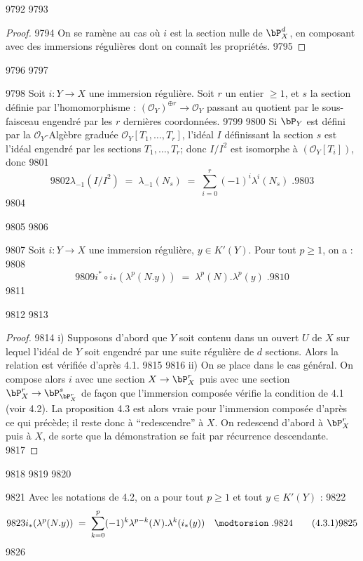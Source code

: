   9792	
  9793	\begin{proof}
  9794	On se ramène au cas où $i$ est la section nulle de $\bP^d_X$, en composant avec des immersions régulières dont on connaît les propriétés.
  9795	\end{proof}
  9796	
  9797	\begin{proposition}[4.2]%
  9798	Soit $i : Y \to X$ une immersion régulière. Soit $r$ un entier $\geq 1$, et $s$ la section définie par l'homomorphisme : $(\mathscr{O}_Y)^{\oplus r} \to \mathscr{O}_Y$ passant au quotient par le sous-faisceau engendré par les $r$ dernières coordonnées.
  9799	
  9800	Si $\bP_Y$ est défini par la $\mathscr{O}_Y$-Algèbre graduée $\mathscr{O}_Y[T_1,\ldots,T_r]$, l'idéal $I$ définissant la section $s$ est l'idéal engendré par les sections $T_1,\ldots,T_r$; donc $I/I^2$ est isomorphe à $(\mathscr{O}_Y[T_i])$, donc
  9801	\[
  9802	\lambda_{-1}(I/I^2) \; = \; \lambda_{-1}(N_s) \; = \; \sum_{i=0}^{r} (-1)^i \lambda^i(N_s)\; .
  9803	\]
  9804	\end{proposition}
  9805	
  9806	\begin{proposition}[4.3]%
  9807	Soit $i : Y \to X$ une immersion régulière, $y \in K'(Y)$. Pour tout $p \geq 1$, on a :
  9808	\[
  9809	i^* \circ i_*(\lambda^p(N.y)) \; = \; \lambda^p(N) . \lambda^p(y)\; .
  9810	\]
  9811	\end{proposition}
  9812	
  9813	\begin{proof}
  9814	i) Supposons d'abord que $Y$ soit contenu dans un ouvert $U$ de $X$ sur lequel l'idéal de $Y$ soit engendré par une suite régulière de $d$ sections. Alors la relation est vérifiée d'après 4.1.
  9815	
  9816	ii) On se place dans le cas général. On compose alors $i$ avec une section $X \to \bP^r_X$ puis avec une section $\bP^r_X \to \bP^s_{\bP^r_X}$ de façon que l'immersion composée vérifie la condition de 4.1 (voir 4.2). La proposition 4.3 est alors vraie pour l'immersion composée d'après ce qui précède; il reste donc à ``redescendre'' à $X$. On redescend d'abord à $\bP^r_X$ puis à $X$, de sorte que la démonstration se fait par récurrence descendante.
  9817	\end{proof}
  9818	
  9819	
  9820	\begin{proposition}[4.3]%
  9821	Avec les notations de 4.2, on a pour tout $p \geq 1$ et tout $y \in K'(Y)$ :
  9822	\[
  9823	i_*(\lambda^p(N.y)) \; = \; \sum_{k=0}^{p} (-1)^k \lambda^{p-k}(N) . \lambda^k(i_*(y)) \quad \modtorsion\; .
  9824	\tag{4.3.1}
  9825	\]
  9826	\end{proposition}
